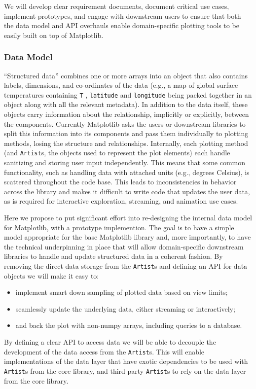 \documentclass[11pt]{article}  %
\begin{document}
We will develop clear requirement documents, document critical use
cases, implement prototypes, and engage with downstream users to
ensure that both the data model and API overhauls enable domain-specific
plotting tools to be easily built on top of Matplotlib.


\subsubsection{Data Model}

``Structured data'' combines one or more arrays into an object that
also contains labels, dimensions, and co-ordinates of the data (e.g., a
map of global surface temperatures containing \texttt{T} ,
\texttt{latitude} and \texttt{longitude} being packed together in an
object along with all the relevant metadata).  In addition to the
data itself, these objects carry information about the
relationship, implicitly or explicitly, between the components.
Currently Matplotlib asks the users or downstream libraries to split
this information into its components and pass them individually to
plotting methods, losing the structure and relationships.
Internally, each plotting method (and \texttt{Artist}s, the objects
used to represent the plot elements) each handle sanitizing and storing user
input independently.  This means that some common functionality, such
as handling data with attached units (e.g., degrees Celsius), is scattered
throughout the
code base.  This leads to inconsistencies in behavior across the
library and makes it difficult to write code that updates the user
data, as is required for interactive exploration, streaming, and animation
use cases.


Here we propose to put significant effort into re-designing the
internal data model for Matplotlib, with a prototype implemention. The
goal is to have a simple model appropriate for the base Matplotlib
library and, more importantly, to have the technical underpinning in
place that will allow domain-specific downstream libraries to
handle and update structured data in a coherent fashion.  By
removing the direct data storage from the \texttt{Artist}s and
defining an API for data objects we will make it easy to:
\begin{itemize}
  \item implement smart down sampling of plotted data based on view
    limits;
  \item seamlessly update the underlying data, either
    streaming or interactively;
  \item and back the plot with non-numpy arrays, including queries to a
    database.
\end{itemize}
By defining a clear API to access data we will be able to decouple
the development of the data access from the \texttt{Artist}s.  This
will enable implementations of the data layer that have exotic
dependencies to be used with \texttt{Artist}s from the core library, and
third-party \texttt{Artist}s to rely on the data layer from the core
library.
\end{document}
